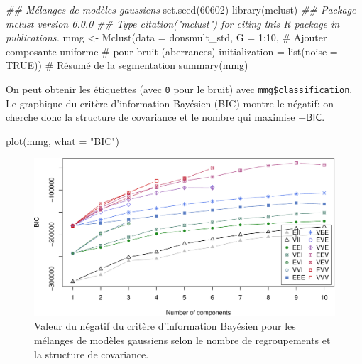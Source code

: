 \documentclass[
  11pt,
  letterpaper,
]{book}
\newenvironment{Shaded}{\begin{snugshade}}{\end{snugshade}}
\newcommand{\AttributeTok}[1]{\textcolor[rgb]{0.40,0.45,0.13}{#1}}
\newcommand{\CommentTok}[1]{\textcolor[rgb]{0.37,0.37,0.37}{#1}}
\newcommand{\ConstantTok}[1]{\textcolor[rgb]{0.56,0.35,0.01}{#1}}
\newcommand{\DecValTok}[1]{\textcolor[rgb]{0.68,0.00,0.00}{#1}}
\newcommand{\DocumentationTok}[1]{\textcolor[rgb]{0.37,0.37,0.37}{\textit{#1}}}
\newcommand{\FunctionTok}[1]{\textcolor[rgb]{0.28,0.35,0.67}{#1}}
\newcommand{\NormalTok}[1]{\textcolor[rgb]{0.00,0.23,0.31}{#1}}
\newcommand{\OtherTok}[1]{\textcolor[rgb]{0.00,0.23,0.31}{#1}}
\newcommand{\SpecialCharTok}[1]{\textcolor[rgb]{0.37,0.37,0.37}{#1}}
\newcommand{\StringTok}[1]{\textcolor[rgb]{0.13,0.47,0.30}{#1}}
\theoremstyle{definition}
\theoremstyle{remark}
\begin{document}
\begin{Shaded}
\begin{Highlighting}[]
\DocumentationTok{\#\# Mélanges de modèles gaussiens}
\FunctionTok{set.seed}\NormalTok{(}\DecValTok{60602}\NormalTok{)}
\FunctionTok{library}\NormalTok{(mclust)}
\DocumentationTok{\#\# Package \textquotesingle{}mclust\textquotesingle{} version 6.0.0}
\DocumentationTok{\#\# Type \textquotesingle{}citation("mclust")\textquotesingle{} for citing this R package in publications.}
\NormalTok{mmg }\OtherTok{\textless{}{-}} \FunctionTok{Mclust}\NormalTok{(}\AttributeTok{data =}\NormalTok{ donsmult\_std,}
       \AttributeTok{G =} \DecValTok{1}\SpecialCharTok{:}\DecValTok{10}\NormalTok{,}
       \CommentTok{\# Ajouter composante uniforme}
       \CommentTok{\#  pour bruit (aberrances)}
       \AttributeTok{initialization =} \FunctionTok{list}\NormalTok{(}\AttributeTok{noise =} \ConstantTok{TRUE}\NormalTok{))}
\CommentTok{\# Résumé de la segmentation}
\FunctionTok{summary}\NormalTok{(mmg)}
\end{Highlighting}
\end{Shaded}

On peut obtenir les étiquettes (avec \texttt{0} pour le bruit) avec
\texttt{mmg\$classification}. Le graphique du critère d'information
Bayésien (BIC) montre le négatif: on cherche donc la structure de
covariance et le nombre qui maximise \(-\mathsf{BIC}\).

\begin{Shaded}
\begin{Highlighting}[]
\FunctionTok{plot}\NormalTok{(mmg, }\AttributeTok{what =} \StringTok{"BIC"}\NormalTok{)}
\end{Highlighting}
\end{Shaded}

\begin{figure}[ht!]

{\centering \includegraphics[width=1\textwidth,height=\textheight]{./03-regroupements_files/figure-pdf/fig-mclustbic-1.pdf}

}

\caption{\label{fig-mclustbic}Valeur du négatif du critère d'information
Bayésien pour les mélanges de modèles gaussiens selon le nombre de
regroupements et la structure de covariance.}

\end{figure}
\end{document}
